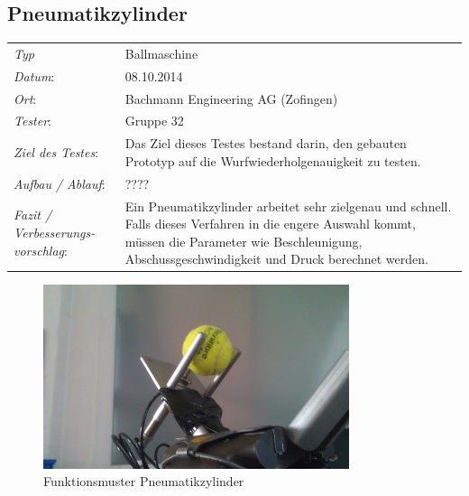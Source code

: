 \subsection{Pneumatikzylinder}

\begin{tabular}{p{3.6cm}p{\textwidth-3.6cm-0.7cm}}
\rule{0pt}{11pt}\textit{Typ}              & Ballmaschine \\ 
\rule{0pt}{11pt}\textit{Datum}:           & 08.10.2014   \\
\rule{0pt}{11pt}\textit{Ort}:             & Bachmann Engineering AG (Zofingen) \\
\rule{0pt}{11pt}\textit{Tester}:          & Gruppe 32\\
\rule{0pt}{11pt}\textit{Ziel des Testes}: & Das Ziel dieses Testes bestand darin, den gebauten Prototyp auf die Wurfwiederholgenauigkeit zu testen. \\
\rule{0pt}{11pt}\textit{Aufbau / Ablauf}: & ????\\
\rule{0pt}{11pt}\textit{Fazit / Verbesserungs-\newline vorschlag}: & Ein Pneumatikzylinder arbeitet sehr zielgenau und schnell. Falls dieses Verfahren in die engere Auswahl kommt, müssen die Parameter wie Beschleunigung, Abschussgeschwindigkeit und Druck berechnet werden.\\ 
\end{tabular}

\begin{figure}[h!]
	\includegraphics[width=0.8\textwidth]{Funktionstests/Bilder/PneumatikzylinderBild.jpg}
	\centering
	\caption{Funktionsmuster Pneumatikzylinder} 
\label{abb:PneumatikzylinderBild}
\end{figure}